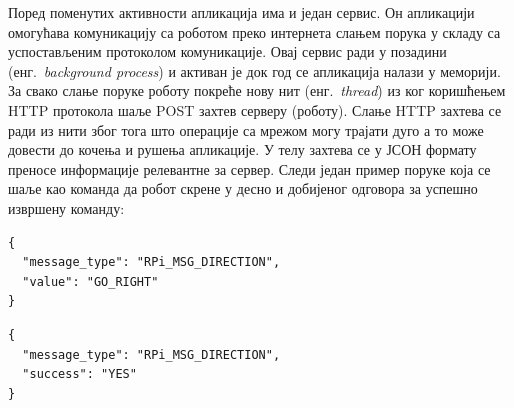 \documentclass[12pt,oneside]{memoir}
\theoremstyle{remark}
\begin{document}
Поред поменутих активности апликација има и један сервис. Он апликацији омогућава комуникацију са роботом преко интернета слањем порука у складу са успостављеним протоколом комуникације. Овај сервис ради у позадини (енг.~{\em background process}) и активан је док год се апликација налази у меморији. За свако слање поруке роботу покреће нову нит (енг.~{\em thread}) из ког коришћењем HTTP протокола шаље POST захтев серверу (роботу). Слање HTTP захтева се ради из нити због тога што операције са мрежом могу трајати дуго а то може довести до кочења и рушења апликације. У телу захтева се у ЈСОН формату преносе информације релевантне за сервер. Следи један пример поруке која се шаље као команда да робот скрене у десно и добијеног одговора за успешно извршену команду:


\begin{lstlisting}[caption={Пример захтева који се шаље роботу за скретање у десно},captionpos=b]
{
  "message_type": "RPi_MSG_DIRECTION",
  "value": "GO_RIGHT"
}
\end{lstlisting}

\begin{lstlisting}[caption={Пример одговора који се добија од робота за успешно извршену команду},captionpos=b]
{
  "message_type": "RPi_MSG_DIRECTION",
  "success": "YES"
}
\end{lstlisting}
\end{document}
